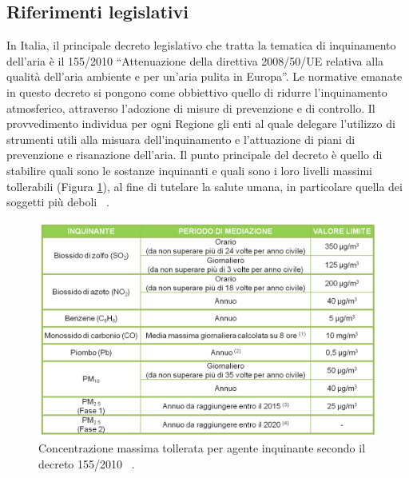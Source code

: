 \subsection{Riferimenti legislativi}
In Italia, il principale decreto legislativo che tratta la tematica di inquinamento dell'aria è il 155/2010 “Attenuazione della direttiva 2008/50/UE relativa alla qualità dell'aria ambiente e per un'aria pulita in Europa”.
Le normative emanate in questo decreto si pongono come obbiettivo quello di ridurre l'inquinamento atmosferico, attraverso l'adozione di misure di prevenzione e di controllo.
Il provvedimento individua per ogni Regione gli enti al quale delegare l'utilizzo di strumenti utili alla misuara dell'inquinamento e l'attuazione di piani di prevenzione e risanazione dell'aria.
Il punto principale del decreto è quello di stabilire quali sono le sostanze inquinanti e quali sono i loro livelli massimi tollerabili (Figura \ref{fig:livelli}), al fine di tutelare la salute umana, in particolare quella dei soggetti più deboli ~\cite{arpa_veneto}.
\begin{figure}
  \includegraphics[width=\linewidth]{img/livelli.png}
  \caption{Concentrazione massima tollerata per agente inquinante secondo il decreto 155/2010 ~\cite{aqitable}.}
  \label{fig:livelli}
\end{figure}


